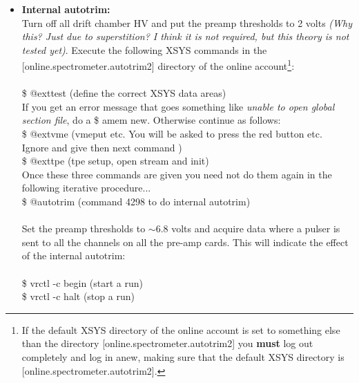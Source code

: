 \documentclass[11pt]{report}
\begin{document}
\begin{itemize}
\item {\bf Internal autotrim:}\\
Turn off all drift chamber HV and put the preamp thresholds to 
2 volts {\it (Why this? Just due to superstition? I think it is not required, but this theory is not tested yet)}.
Execute the following XSYS commands in the [online.spectrometer.autotrim2]
directory of the online account\footnote{If the default XSYS directory of the
online account is set to something else than the
directory [online.spectrometer.autotrim2] you {\bf must} log out completely and log in anew, making sure that the default XSYS directory is [online.spectrometer.autotrim2]. 
}:
\\
\\ \indent \$   @exttest   \hspace{1.9cm} (define the correct XSYS data areas)
\\If you get an error message that goes something like {\it unable to open global section file}, do a \$ amem new. Otherwise continue as follows:
\\ \indent \$	@extvme    \hspace{1.8cm} (vmeput etc. You will be asked to press the red button etc. 
\\  \indent \hspace{3.8cm} Ignore and give then next command )
\\ \indent \$	@exttpe    \hspace{2cm}  (tpe setup, open stream and init)
\\ Once these three commands are given you need not do them again in the following iterative procedure...
\\ \indent \$	@autotrim  \hspace{1.6cm}  (command 4298 to do internal autotrim)\\
\\Set the preamp thresholds to $\sim$6.8 volts and acquire data where a pulser 
is sent to all the channels on all the pre-amp cards. This will indicate 
the effect of the internal autotrim: 
\\
\\ \indent \$	vrctl -c begin \hspace{1.8cm} (start a run)
\\ \indent \$ 	vrctl -c halt \hspace{1.95cm} (stop a run)\\


\end{itemize}
\end{document}
